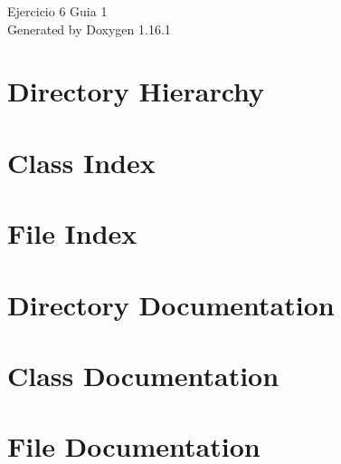 \documentclass[twoside]{book}
\newcommand{\+}{\discretionary{\mbox{\scriptsize$\hookleftarrow$}}{}{}}
\newcommand{\clearemptydoublepage}{%
    \newpage{\pagestyle{empty}\cleardoublepage}%
  }
\begin{document}
  \raggedbottom
    \hypersetup{pageanchor=false,
                bookmarksnumbered=true,
                pdfencoding=unicode
               }
  \begin{titlepage}
  \vspace*{7cm}
  \begin{center}%
  {\Large Ejercicio 6 Guia 1}\\
  \vspace*{1cm}
  {\large Generated by Doxygen 1.16.1}\\
  \end{center}
  \end{titlepage}
  \clearemptydoublepage
  \tableofcontents
  \clearemptydoublepage
  \hypersetup{pageanchor=true}

\chapter{Directory Hierarchy}

\chapter{Class Index}

\chapter{File Index}

\chapter{Directory Documentation}




\chapter{Class Documentation}

\chapter{File Documentation}

  \backmatter
  \newpage
  \clearemptydoublepage
  \printindex
\end{document}
